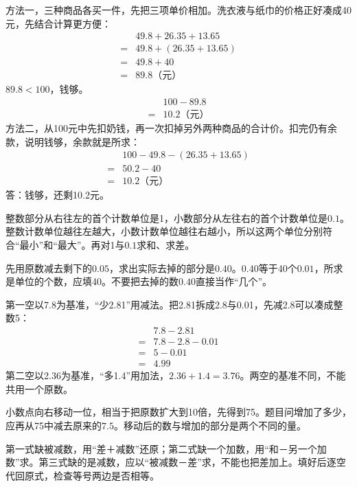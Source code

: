 \documentclass[multi=snippet,border=0pt]{standalone}
\newenvironment{snippet}[3]{\begin{minipage}{#1bp}\color{answerred}\fontsize{#2}{#3}\selectfont\raggedright}{\end{minipage}}
\begin{document}
\begin{snippet}{505}{11.5}{14}方法一，三种商品各买一件，先把三项单价相加。洗衣液与纸巾的价格正好凑成40元，先结合计算更方便：\[\begin{aligned}&49.8+26.35+13.65\\={}&49.8+(26.35+13.65)\\={}&49.8+40\\={}&89.8\text{（元）}\end{aligned}\]\(89.8<100\)，钱够。\[\begin{aligned}&100-89.8\\={}&10.2\text{（元）}\end{aligned}\]方法二，从100元中先扣奶钱，再一次扣掉另外两种商品的合计价。扣完仍有余款，说明钱够，余款就是所求：\[\begin{aligned}&100-49.8-(26.35+13.65)\\={}&50.2-40\\={}&10.2\text{（元）}\end{aligned}\]答：钱够，还剩10.2元。\end{snippet}
\begin{snippet}{505}{11.5}{14}整数部分从右往左的首个计数单位是1，小数部分从左往右的首个计数单位是\(0.1\)。整数计数单位越往左越大，小数计数单位越往右越小，所以这两个单位分别符合“最小”和“最大”。再对1与\(0.1\)求和、求差。\end{snippet}
\begin{snippet}{505}{11.5}{14}先用原数减去剩下的\(0.05\)，求出实际去掉的部分是\(0.40\)。\(0.40\)等于40个\(0.01\)，所求是单位的个数，应填40。不要把去掉的数\(0.40\)直接当作“几个”。\end{snippet}
\begin{snippet}{505}{11.5}{14}第一空以7.8为基准，“少2.81”用减法。把2.81拆成2.8与0.01，先减2.8可以凑成整数5：\[\begin{aligned}&7.8-2.81\\={}&7.8-2.8-0.01\\={}&5-0.01\\={}&4.99\end{aligned}\]第二空以2.36为基准，“多1.4”用加法，\(2.36+1.4=3.76\)。两空的基准不同，不能共用一个原数。\end{snippet}
\begin{snippet}{505}{11.5}{14}小数点向右移动一位，相当于把原数扩大到10倍，先得到75。题目问增加了多少，应再从75中减去原来的\(7.5\)。移动后的数与增加的部分是两个不同的量。\end{snippet}
\begin{snippet}{505}{11.5}{14}第一式缺被减数，用“差＋减数”还原；第二式缺一个加数，用“和－另一个加数”求。第三式缺的是减数，应以“被减数－差”求，不能也把差加上。填好后逐空代回原式，检查等号两边是否相等。\end{snippet}
\end{document}
